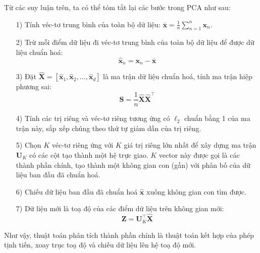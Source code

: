 \documentclass[../thesis.tex]{subfiles}
\begin{document}
Từ các suy luận trên, ta có thể tóm tắt lại các bước trong PCA như sau: 
\begin{itemize}
	\item[1)] Tính véc-tơ trung bình của toàn bộ dữ liệu:
	\begin{math} 
		\bar{\mathbf{x}} = \frac{1}{n} \sum_{n=1}^n \mathbf{x}_n 
	\end{math}.
	\item[2)] Trừ mỗi điểm dữ liệu đi véc-tơ trung bình của toàn bộ dữ liệu để được dữ
	liệu chuẩn hoá:
	\begin{equation*} 
		\hat{\mathbf{x}}_n = \mathbf{x}_n - \bar{\mathbf{x}} 
	\end{equation*} 
	\item[3)] Đặt $\widehat{\mathbf{X}} = [\widehat{\mathbf{x}}_1, \widehat{\mathbf{x}}_2, \dots,
	\widehat{\mathbf{x}}_d]$ là ma trận dữ liệu chuẩn hoá, tính ma trận hiệp phương sai: $$ \mathbf{S} = \frac{1}{n}\widehat{\mathbf{X}}\widehat{\mathbf{X}}^\top $$
	\item[4)] Tính các trị riêng và véc-tơ riêng tương ứng có $\ell_2$ chuẩn bằng 1
	của ma trận này, sắp xếp chúng theo thứ tự giảm dần của trị riêng.
	\item[5)] Chọn $K$ véc-tơ riêng ứng với $K$ giá trị riêng lớn nhất để xây dựng ma trận $\mathbf{U}_K$ có các cột tạo thành một hệ trực giao. $K$ vector này được gọi là các thành phần chính, tạo thành một không gian con (gần) với phân bố của dữ liệu ban đầu đã chuẩn hoá. 
	\item[6)] Chiếu dữ liệu ban đầu đã chuẩn hoá $\widehat{\mathbf{x}}$ xuống không gian con tìm được. 
	\item[7)] Dữ liệu mới là toạ độ của các điểm dữ liệu trên không gian mới: $$ \mathbf{Z} = \mathbf{U}_K^\top\widehat{\mathbf{X}}$$
\end{itemize}

Như vậy, thuật toán phân tích thành phần chính là thuật toán kết hợp của phép tịnh tiến, xoay trục toạ độ và chiếu dữ liệu lên hệ toạ độ mới.
\end{document}
